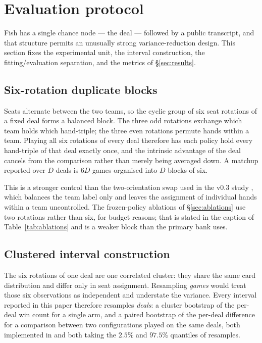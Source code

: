 \section{Evaluation protocol}
\label{sec:protocol}

Fish has a single chance node --- the deal --- followed by a public
transcript, and that structure permits an unusually strong variance-reduction
design. This section fixes the experimental unit, the interval construction,
the fitting/evaluation separation, and the metrics of \S\ref{sec:results}.

\subsection{Six-rotation duplicate blocks}
\label{sec:protocol-blocks}

Seats alternate between the two teams, so the cyclic group of six seat
rotations of a fixed deal forms a balanced block. The three odd rotations
exchange which team holds which hand-triple; the three even rotations permute
hands within a team. Playing all six rotations of every deal therefore has
each policy hold every hand-triple of that deal exactly once, and the
intrinsic advantage of the deal cancels from the comparison rather than merely
being averaged down. A matchup reported over $D$ deals is $6D$ games organised
into $D$ blocks of six.

This is a stronger control than the two-orientation swap used in the v0.3
study \cite{fishbot03}, which balances the team label only and leaves the
assignment of individual hands within a team uncontrolled. The frozen-policy
ablations of \S\ref{sec:ablations} use two rotations rather than six, for
budget reasons; that is stated in the caption of Table~\ref{tab:ablations} and
is a weaker block than the primary bank uses.

\subsection{Clustered interval construction}
\label{sec:protocol-ci}

The six rotations of one deal are one correlated cluster: they share the same
card distribution and differ only in seat assignment. Resampling \emph{games}
would treat those six observations as independent and understate the variance.
Every interval reported in this paper therefore resamples \emph{deals}: a cluster
bootstrap of the per-deal win count for a single arm, and a paired bootstrap of
the per-deal difference for a comparison between two configurations played on the
same deals, both implemented in  and both taking
the $2.5\%$ and $97.5\%$ quantiles of \numBootstrapDraws{} resamples.

